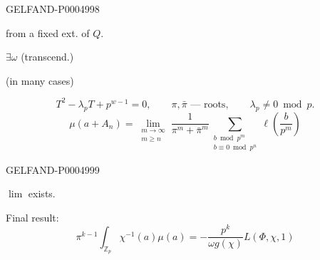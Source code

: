 \begin{GelfandAdjacentEvidence}{GELFAND-P000499}{8}

from a fixed ext. of $Q$.
\begin{flushright}
$\exists\omega$ (transcend.)
\end{flushright}
(in many cases)

\[
T^2-\lambda_pT+p^{w-1}=0,\qquad
\pi,\bar\pi\text{ — roots},\qquad\lambda_p\ne0\bmod p.
\]
\[
\mu(a+A_n)=\lim_{\substack{m\to\infty\\m\ge n}}
\frac{1}{\pi^m+\bar\pi^m}
\sum_{\substack{b\bmod p^m\\b\equiv0\bmod p^n}}
\ell\left(\frac{b}{p^m}\right)
\]
\end{GelfandAdjacentEvidence}
\begin{GelfandAdjacentEvidence}{GELFAND-P000499}{9}

\end{GelfandAdjacentEvidence}


$\lim$ exists.

Final result:
\[
\pi^{k-1}\int_{\mathbb{Z}_p}\chi^{-1}(a)\mu(a)
=-\frac{p^k}{\omega g(\chi)}L(\Phi,\chi,1)
\]


